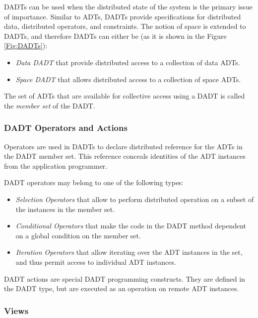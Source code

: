 DADTs can be used when the distributed state of the system is the primary issue of importance. Similar to ADTs, DADTs 
provide specifications for distributed data, distributed operators, and 
constraints. The notion of space is extended to DADTs, and therefore DADTs can
either be (as it is shown in the Figure \ref{Fig:DADTs}):

\begin{itemize}
  \item \emph{Data DADT} that provide distributed access to a collection of data
  ADTs.
  \item \emph{Space DADT} that allows distributed access to a collection of
  space ADTs. 
\end{itemize}

The set of ADTs that are available for collective access using a DADT is called the \emph{member set} of
the DADT.

\subsubsection{DADT Operators and Actions} \label{subsubsec:OperatorsAndActions}

Operators are used in DADTs to declare distributed reference for
the ADTs in the DADT member set. This reference conceals identities of the ADT
instances from the application programmer. 

DADT operators may belong to one of the following types:

\begin{itemize}
  \item \emph{Selection Operators} that allow to perform
  distributed operation on a subset of the instances in the member set.
  \item \emph{Conditional Operators} that make the code in the
  DADT method dependent on a global condition on the member set. 
  \item \emph{Iteration Operators} that allow iterating over the
  ADT instances in the set, and thus permit access to individual ADT instances.
\end{itemize}

DADT actions are special DADT programming constructs. They are defined in the
DADT type, but are executed as an operation on remote ADT instances. 


\subsubsection{Views} \label{subsubsec:views}

